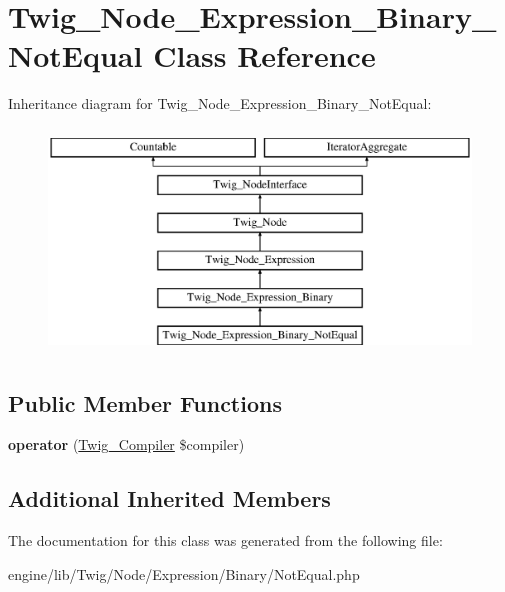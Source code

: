 \hypertarget{class_twig___node___expression___binary___not_equal}{}\section{Twig\+\_\+\+Node\+\_\+\+Expression\+\_\+\+Binary\+\_\+\+Not\+Equal Class Reference}
\label{class_twig___node___expression___binary___not_equal}
Inheritance diagram for Twig\+\_\+\+Node\+\_\+\+Expression\+\_\+\+Binary\+\_\+\+Not\+Equal\+:\begin{figure}[H]
\begin{center}
\leavevmode
\includegraphics[height=6.000000cm]{class_twig___node___expression___binary___not_equal}
\end{center}
\end{figure}
\subsection*{Public Member Functions}
\begin{DoxyCompactItemize}
\item 
\hypertarget{class_twig___node___expression___binary___not_equal_af77318ec88d5f8a508684970a150b670}{}{\bfseries operator} (\hyperlink{class_twig___compiler}{Twig\+\_\+\+Compiler} \$compiler)\label{class_twig___node___expression___binary___not_equal_af77318ec88d5f8a508684970a150b670}

\end{DoxyCompactItemize}
\subsection*{Additional Inherited Members}


The documentation for this class was generated from the following file\+:\begin{DoxyCompactItemize}
\item 
engine/lib/\+Twig/\+Node/\+Expression/\+Binary/Not\+Equal.\+php\end{DoxyCompactItemize}
